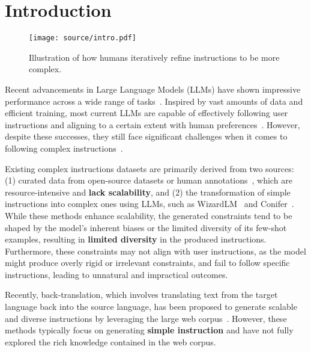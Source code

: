 \section{Introduction}

\begin{figure}[t]
    \centering
    \texttt{[image: source/intro.pdf]}
    \caption{Illustration of how humans iteratively refine instructions to be more complex.}
    \label{fig: intro}
    \vspace{-1mm}
\end{figure}

Recent advancements in Large Language Models (LLMs) have shown impressive performance across a wide range of tasks~\cite{zhao2023survey, li2024graphreader}. Inspired by vast amounts of data and efficient training, most current LLMs are capable of effectively following user instructions and aligning to a certain extent with human preferences~\cite{ouyang2022training,li20242d}.
However, despite these successes, they still face significant challenges when it comes to following complex instructions~\cite{jiang2023followbench,wen2024benchmarking}.

Existing complex instructions datasets are primarily derived from two sources: (1) curated data from open-source datasets or human annotations~\cite{zhou2024lima,zhang2024cfbench,he2024can}, which are resource-intensive and \textbf{lack scalability}, and (2) the transformation of simple instructions into complex ones using LLMs, such as WizardLM~\cite{xu2023wizardlm} and Conifer~\cite{sun2024conifer}. 
While these methods enhance scalability, the generated constraints tend to be shaped by the model’s inherent biases or the limited diversity of its few-shot examples, resulting in \textbf{limited diversity} in the produced instructions.
Furthermore, these constraints may not align with user instructions, as the model might produce overly rigid or irrelevant constraints, and fail to follow specific instructions, leading to unnatural and impractical outcomes.

Recently,
back-translation, which involves translating text from the target language back into the source language, 
has been proposed to generate scalable and diverse instructions by leveraging the large web corpus~\cite{sennrich2015improving,hoang2018iterative,zheng2024kun,li2023self}. 
However, these methods typically focus on generating \textbf{simple instruction} and have not fully explored the rich knowledge contained in the web corpus.

